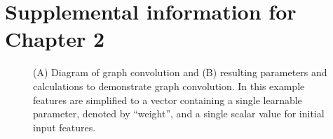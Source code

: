 \chapter{Supplemental information for Chapter 2}

\begin{figure}
    \centering
    \caption[Diagram of graph convolution]{(A) Diagram of graph convolution and (B) resulting parameters and calculations to demonstrate graph convolution. In this example features are simplified to a vector containing a single learnable parameter, denoted by “weight”, and a single scalar value for initial input features.}
    \label{fig:convolution}
\end{figure}

